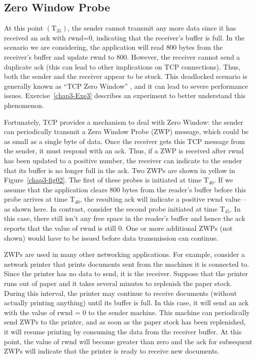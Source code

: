\begin{multicols}{2}
\section{Zero Window Probe}

At this point $({\text{T}}_{35})$, the sender cannot transmit any more data since it has received an ack with rwnd=0, indicating that the receiver’s buffer is full. In the scenario we are considering, the application will read 800 bytes from the receiver’s buffer and update rwnd to 800. However, the receiver cannot send a duplicate ack (this can lead to other implications on TCP connections). Thus, both the sender and the receiver appear to be stuck. This deadlocked scenario is generally known as “TCP Zero Window” \cite{art3-key10}\cite{art3-key11}, and it can lead to severe performance issues. Exercise~\ref{chap3-Exe3} describes an experiment to better understand this phenomenon.

Fortunately, TCP provides a mechanism to deal with Zero Window: the sender can periodically transmit a Zero Window Probe (ZWP) message, which could be as small as a single byte of data. Once the receiver gets this TCP message from the sender, it must respond with an ack. Thus, if a ZWP is received after rwnd has been updated to a positive number, the receiver can indicate to the sender that its buffer is no longer full in the ack. Two ZWPs are shown in yellow in Figure~\ref{chap3-fig02}. The first of these probes is initiated at time ${\text{T}}_{40}$. If we assume that the application clears 800 bytes from the reader’s buffer before this probe arrives at time ${\text{T}}_{40}$, the resulting ack will indicate a positive rwnd value – as shown here. In contrast, consider the second probe initiated at time ${\text{T}}_{45}$. In this case, there still isn’t any free space in the reader’s buffer and hence the ack reports that the value of rwnd is still 0. One or more additional ZWPs (not shown) would have to be issued before data transmission can continue.

ZWPs are used in many other networking applications. For example, consider a network printer that prints documents sent from the machines it is connected to. Since the printer has no data to send, it is the receiver. Suppose that the printer runs out of paper and it takes several minutes to replenish the paper stock. During this interval, the printer may continue to receive documents (without actually printing anything) until its buffer is full. In this case, it will send an ack with the value of rwnd = 0 to the sender machine. This machine can periodically send ZWPs to the printer, and as soon as the paper stock has been replenished, it will resume printing by consuming the data from the receiver buffer. At this point, the value of rwnd will become greater than zero and the ack for subsequent ZWPs will indicate that the printer is ready to receive new documents.


\end{multicols}
